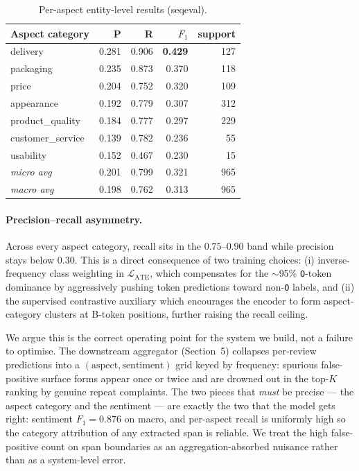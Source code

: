 \documentclass[conference]{IEEEtran}
\begin{document}
\begin{table}[t]
\caption{Per-aspect entity-level results (seqeval).}
\label{tab:per_aspect}
\centering
\begin{tabular}{lrrrr}
\toprule
Aspect category    & P     & R     & $F_1$ & support \\
\midrule
delivery           & 0.281 & 0.906 & \textbf{0.429} & 127 \\
packaging          & 0.235 & 0.873 & 0.370 & 118 \\
price              & 0.204 & 0.752 & 0.320 & 109 \\
appearance         & 0.192 & 0.779 & 0.307 & 312 \\
product\_quality   & 0.184 & 0.777 & 0.297 & 229 \\
customer\_service  & 0.139 & 0.782 & 0.236 &  55 \\
usability          & 0.152 & 0.467 & 0.230 &  15 \\
\midrule
\textit{micro avg} & 0.201 & 0.799 & 0.321 & 965 \\
\textit{macro avg} & 0.198 & 0.762 & 0.313 & 965 \\
\bottomrule
\end{tabular}
\end{table}

\paragraph{Precision--recall asymmetry.}
Across every aspect category, recall sits in the $0.75$–$0.90$ band
while precision stays below $0.30$. This is a direct consequence of two
training choices: (i) inverse-frequency class weighting in
$\mathcal{L}_{\text{ATE}}$, which compensates for the $\sim$95\%
\texttt{O}-token dominance by aggressively pushing token predictions
toward non-\texttt{O} labels, and (ii) the supervised contrastive
auxiliary which encourages the encoder to form aspect-category
clusters at B-token positions, further raising the recall ceiling.

We argue this is the correct operating point for the system we build,
not a failure to optimise. The downstream aggregator
(Section~5) collapses per-review predictions into a
$(\text{aspect}, \text{sentiment})$ grid keyed by frequency: spurious
false-positive surface forms appear once or twice and are drowned out
in the top-$K$ ranking by genuine repeat complaints. The two pieces
that \emph{must} be precise — the aspect category and the sentiment —
are exactly the two that the model gets right: sentiment $F_1 = 0.876$
on macro, and per-aspect recall is uniformly high so the category
attribution of any extracted span is reliable. We treat the high
false-positive count on span boundaries as an aggregation-absorbed
nuisance rather than as a system-level error.
\end{document}
